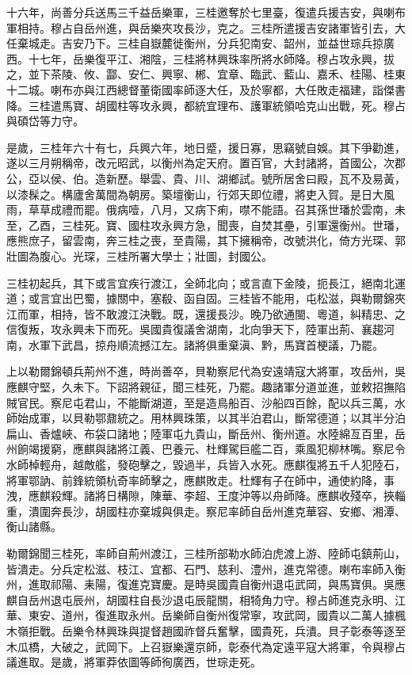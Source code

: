 \begin{pinyinscope}
十六年，尚善分兵送馬三千益岳樂軍，三桂邀奪於七里臺，復遣兵援吉安，與喇布軍相持。穆占自岳州進，與岳樂夾攻長沙，克之。三桂所遣援吉安諸軍皆引去，大任棄城走。吉安乃下。三桂自嶽麓徙衡州，分兵犯南安、韶州，並益世琮兵掠廣西。十七年，岳樂復平江、湘陰，三桂將林興珠率所將水師降。穆占攻永興，拔之，並下茶陵、攸、酃、安仁、興寧、郴、宜章、臨武、藍山、嘉禾、桂陽、桂東十二城。喇布亦與江西總督董衛國率師逐大任，及於寧都，大任敗走福建，詣傑書降。三桂遣馬寶、胡國柱等攻永興，都統宜理布、護軍統領哈克山出戰，死。穆占與碩岱等力守。

是歲，三桂年六十有七，兵興六年，地日蹙，援日寡，思竊號自娛。其下爭勸進，遂以三月朔稱帝，改元昭武，以衡州為定天府。置百官，大封諸將，首國公，次郡公，亞以侯、伯。造新歷。舉雲、貴、川、湖鄉試。號所居舍曰殿，瓦不及易黃，以漆髹之。構廬舍萬間為朝房。築壇衡山，行郊天即位禮，將吏入賀。是日大風雨，草草成禮而罷。俄病噎，八月，又病下痢，噤不能語。召其孫世璠於雲南，未至，乙酉，三桂死。寶、國柱攻永興方急，聞喪，自焚其壘，引軍還衡州。世璠，應熊庶子，留雲南，奔三桂之喪，至貴陽，其下擁稱帝，改號洪化，倚方光琛、郭壯圖為腹心。光琛，三桂所署大學士；壯圖，封國公。

三桂初起兵，其下或言宜疾行渡江，全師北向；或言直下金陵，扼長江，絕南北運道；或言宜出巴蜀，據關中，塞殽、函自固。三桂皆不能用，屯松滋，與勒爾錦夾江而軍，相持，皆不敢渡江決戰。既，還援長沙。晚乃欲通閩、粵道，糾精忠、之信復叛，攻永興未下而死。吳國貴復議舍湖南，北向爭天下，陸軍出荊、襄趨河南，水軍下武昌，掠舟順流撼江左。諸將俱重棄滇、黔，馬寶首梗議，乃罷。

上以勒爾錦頓兵荊州不進，時尚善卒，貝勒察尼代為安遠靖寇大將軍，攻岳州，吳應麒守堅，久未下。下詔將親征，聞三桂死，乃罷。趣諸軍分道並進，並敕招撫陷賊官民。察尼屯君山，不能斷湖道，至是造鳥船百、沙船四百餘，配以兵三萬，水師始成軍，以貝勒鄂鼐統之。用林興珠策，以其半泊君山，斷常德道；以其半分泊扁山、香爐峽、布袋口諸地；陸軍屯九貴山，斷岳州、衡州道。水陸綿亙百里，岳州餉竭援窮，應麒與諸將江義、巴養元、杜輝駕巨艦二百，乘風犯柳林嘴。察尼令水師棹輕舟，越敵艦，發砲擊之，毀過半，兵皆入水死。應麒復將五千人犯陸石，將軍鄂訥、前鋒統領杭奇率師擊之，應麒敗走。杜輝有子在師中，通使約降，事洩，應麒殺輝。諸將日構隙，陳華、李超、王度沖等以舟師降。應麒收殘卒，挾輜重，潰圍奔長沙，胡國柱亦棄城與俱走。察尼率師自岳州進克華容、安鄉、湘潭、衡山諸縣。

勒爾錦聞三桂死，率師自荊州渡江，三桂所部勒水師泊虎渡上游、陸師屯鎮荊山，皆潰走。分兵定松滋、枝江、宜都、石門、慈利、澧州，進克常德。喇布率師入衡州，進取祁陽、耒陽，復進克寶慶。是時吳國貴自衡州退屯武岡，與馬寶俱。吳應麒自岳州退屯辰州，胡國柱自長沙退屯辰龍關，相犄角力守。穆占師進克永明、江華、東安、道州，復進取永州。岳樂師自衡州復常寧，攻武岡，國貴以二萬人據楓木嶺拒戰。岳樂令林興珠與提督趙國祚督兵奮擊，國貴死，兵潰。貝子彰泰等逐至木瓜橋，大破之，武岡下。上召嶽樂還京師，彰泰代為定遠平寇大將軍，令與穆占議進取。是歲，將軍莽依圖等師徇廣西，世琮走死。


\end{pinyinscope}
